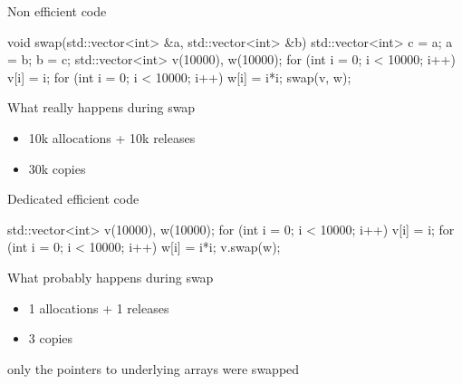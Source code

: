 \begin{frame}[fragile]
  \begin{exampleblock}{Non efficient code}
    \begin{cppcode*}{}
      void swap(std::vector<int> &a,
                std::vector<int> &b) {
        std::vector<int> c = a;
        a = b;
        b = c;
      }
      std::vector<int> v(10000), w(10000);
      for (int i = 0; i < 10000; i++) v[i] = i;
      for (int i = 0; i < 10000; i++) w[i] = i*i;
      swap(v, w);
    \end{cppcode*}
  \end{exampleblock}
  \pause
  \begin{alertblock}{What really happens during swap}
    \begin{itemize}
    \item 10k allocations + 10k releases
    \item 30k copies
    \end{itemize}
  \end{alertblock}
\end{frame}

\begin{frame}[fragile]
  \begin{exampleblock}{Dedicated efficient code}
    \begin{cppcode*}{}
      std::vector<int> v(10000), w(10000);
      for (int i = 0; i < 10000; i++) v[i] = i;
      for (int i = 0; i < 10000; i++) w[i] = i*i;
      v.swap(w);
      \end{cppcode*}
  \end{exampleblock}
  \pause
  \begin{block}{What probably happens during swap}
    \begin{itemize}
    \item 1 allocations + 1 releases
    \item 3 copies
    \end{itemize}
    only the pointers to underlying arrays were swapped
  \end{block}
\end{frame}

